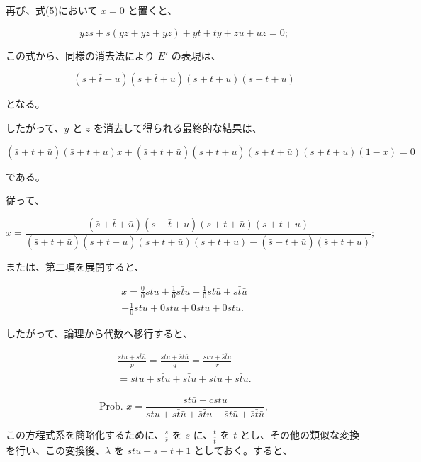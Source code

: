 \documentclass[a4paper,11pt,openany]{ltjsbook}
\begin{document}
再び、式(5)において \(x = 0\) と置くと、

\[
yz\bar{s} + s(y\bar{z} + \bar{y}z + \bar{y}\bar{z}) + y\bar{t} + t\bar{y} + z\bar{u} + u\bar{z} = 0;
\]

この式から、同様の消去法により \(E'\) の表現は、

\[
(\bar{s} + \bar{t} + \bar{u})(s + \bar{t} + u)(s + t + \bar{u})(s + t + u)
\]

となる。

したがって、\(y\) と \(z\) を消去して得られる最終的な結果は、

\[
(\bar{s} + \bar{t} + \bar{u})(\bar{s} + t + u)x + (\bar{s} + \bar{t} + \bar{u})(s + \bar{t} + u)(s + t + \bar{u})(s + t + u)(1 - x) = 0
\]

である。

従って、

\[
x = \frac{(\bar{s} + \bar{t} + \bar{u})(s + \bar{t} + u)(s + t + \bar{u})(s + t + u)}
         {(\bar{s} + \bar{t} + \bar{u})(s + \bar{t} + u)(s + t + \bar{u})(s + t + u) - (\bar{s} + \bar{t} + \bar{u})(\bar{s} + t + u)};
\]

または、第二項を展開すると、

\begin{equation}
\begin{split}
x = \frac{0}{0}stu + \frac{1}{0}s\bar{t}u + \frac{1}{0}st\bar{u}
+ s\bar{t}\bar{u}
\\
+ \frac{1}{0}\bar{s}tu + 0\bar{s}\bar{t}u + 0\bar{s}t\bar{u}
+ 0\bar{s}\bar{t}\bar{u}. %
\end{split}
\end{equation}

したがって、論理から代数へ移行すると、

\begin{equation}
\begin{split}
  \frac{stu + s\bar{t}\bar{u}}{p}
= \frac{stu + \bar{s}t\bar{u}}{q}
= \frac{stu + \bar{s}\bar{t}u}{r}
\\
= stu + s\bar{t}\bar{u} + \bar{s}\bar{t}u + \bar{s}t\bar{u}
+ \bar{s}\bar{t}\bar{u}. %
\end{split}
\end{equation}

\[
  \text{Prob. }x = \frac{s\bar{t}\bar{u} + cstu}{stu + s\bar{t}\bar{u} + \bar{s}\bar{t}u + \bar{s}t\bar{u} + \bar{s}\bar{t}\bar{u}}, \tag{8}
\]

この方程式系を簡略化するために、${\displaystyle \frac{s}{\bar{s}}}$ を ${\displaystyle s}$ に、${\displaystyle \frac{t}{\bar{t}}}$ を $t$ とし、その他の類似な変換を行い、この変換後、$\lambda$ を $stu + s + t + 1$ としておく。すると、
\end{document}
